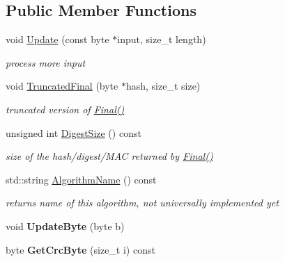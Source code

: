 \subsection*{Public Member Functions}
\begin{DoxyCompactItemize}
\item 
\hypertarget{class_c_r_c32_abd642abba82cf63edb025461bc1af8c0}{
void \hyperlink{class_c_r_c32_abd642abba82cf63edb025461bc1af8c0}{Update} (const byte $\ast$input, size\_\-t length)}
\label{class_c_r_c32_abd642abba82cf63edb025461bc1af8c0}

\begin{DoxyCompactList}\small\item\em process more input \item\end{DoxyCompactList}\item 
\hypertarget{class_c_r_c32_ab6f1523fe38d6f1b690888aab1675982}{
void \hyperlink{class_c_r_c32_ab6f1523fe38d6f1b690888aab1675982}{TruncatedFinal} (byte $\ast$hash, size\_\-t size)}
\label{class_c_r_c32_ab6f1523fe38d6f1b690888aab1675982}

\begin{DoxyCompactList}\small\item\em truncated version of \hyperlink{class_hash_transformation_aa0b8c7a110d8968268fd02ec32b9a8e8}{Final()} \item\end{DoxyCompactList}\item 
\hypertarget{class_c_r_c32_ab95565f8b50d25d21cb71e57fad42d23}{
unsigned int \hyperlink{class_c_r_c32_ab95565f8b50d25d21cb71e57fad42d23}{DigestSize} () const }
\label{class_c_r_c32_ab95565f8b50d25d21cb71e57fad42d23}

\begin{DoxyCompactList}\small\item\em size of the hash/digest/MAC returned by \hyperlink{class_hash_transformation_aa0b8c7a110d8968268fd02ec32b9a8e8}{Final()} \item\end{DoxyCompactList}\item 
\hypertarget{class_c_r_c32_ab8f81785058afdb88b1d9567ea36860e}{
std::string \hyperlink{class_c_r_c32_ab8f81785058afdb88b1d9567ea36860e}{AlgorithmName} () const }
\label{class_c_r_c32_ab8f81785058afdb88b1d9567ea36860e}

\begin{DoxyCompactList}\small\item\em returns name of this algorithm, not universally implemented yet \item\end{DoxyCompactList}\item 
\hypertarget{class_c_r_c32_ad1e5051e34441f8cc0d73aac51935424}{
void {\bfseries UpdateByte} (byte b)}
\label{class_c_r_c32_ad1e5051e34441f8cc0d73aac51935424}

\item 
\hypertarget{class_c_r_c32_a2ecbd258f526f67d9a28c38d88c4ab0d}{
byte {\bfseries GetCrcByte} (size\_\-t i) const }
\label{class_c_r_c32_a2ecbd258f526f67d9a28c38d88c4ab0d}

\end{DoxyCompactItemize}
